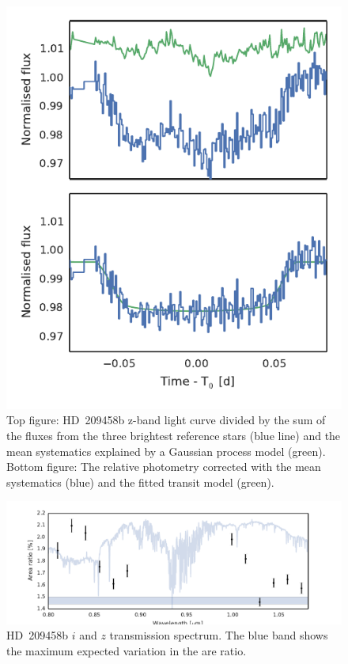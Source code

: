 \documentclass[useAMS,usenatbib]{mn2e}
\begin{document}
\begin{figure}
 \centering
 \includegraphics[width=\columnwidth]{hd_209458b_lc_with_gp_prediction.pdf}
 \caption{Top figure: HD~209458b z-band light curve divided by the sum of the fluxes from the three brightest reference 
stars (blue line) and the mean systematics explained by a Gaussian process model (green). Bottom figure: The relative 
photometry corrected with the mean systematics (blue) and the fitted transit model (green).}
 \label{fig:hd_209458b_relative_lc}
\end{figure}

\begin{figure}
 \centering
 \includegraphics[width=\textwidth]{hd_209458b_final.pdf}
 \caption{HD~209458b $i$ and $z$ transmission spectrum. The blue band shows the maximum expected variation in the are 
  ratio.}
 \label{fig:hd_209458b_final}
\end{figure}
\end{document}

